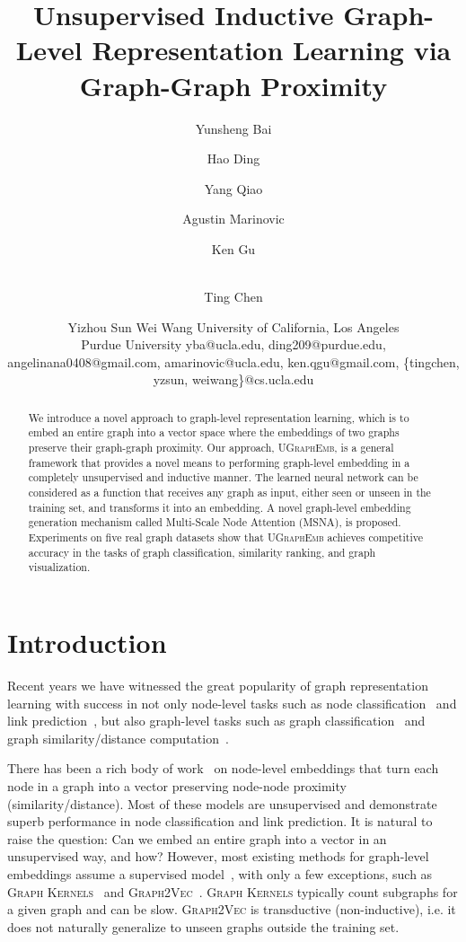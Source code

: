 \documentclass{article}
\title{Unsupervised Inductive Graph-Level Representation Learning via \\ Graph-Graph Proximity}
\author{
Yunsheng Bai
\and
Hao Ding\and
Yang Qiao\and
Agustin Marinovic\and
Ken Gu\and \\
Ting Chen\and
Yizhou Sun\And
Wei Wang
\affiliations
University of California, Los Angeles\\
Purdue University
\emails
yba@ucla.edu,
ding209@purdue.edu,
angelinana0408@gmail.com,
amarinovic@ucla.edu,
ken.qgu@gmail.com,
\{tingchen, yzsun, weiwang\}@cs.ucla.edu
}
\newcommand{\model}{\textsc{UGraphEmb}\xspace}
\newcommand{\gk}{\textsc{Graph Kernels}\xspace}
\newcommand{\gv}{\textsc{Graph2Vec}\xspace}
\begin{document}
\maketitle

\begin{abstract}

We introduce a novel approach to graph-level representation learning, which is to embed an entire graph into a vector space where the embeddings of two graphs preserve their graph-graph proximity. Our approach, \model, is a general framework that provides a novel means to performing graph-level embedding in a completely unsupervised and inductive manner. The learned neural network can be considered as a function that receives any graph as input, either seen or unseen in the training set, and transforms it into an embedding. A novel graph-level embedding generation mechanism called Multi-Scale Node Attention (MSNA), is proposed. Experiments on five real graph datasets show that \model achieves competitive accuracy in the tasks of graph classification, similarity ranking, and graph visualization.




\end{abstract}
 \section{Introduction}
\label{sec-intro}


Recent years we have witnessed the great popularity of graph representation learning with success in not only node-level tasks such as node classification~\cite{kipf2016semi} and link prediction~\cite{zhang2018link}, but also graph-level tasks such as graph classification~\cite{ying2018hierarchical} and graph similarity/distance computation~\cite{bai2018graph}. 


There has been a rich body of work~\cite{belkin2003laplacian,tang2015line,qiu2017network} 
on node-level embeddings that turn each node in a graph into a vector preserving node-node proximity (similarity/distance). Most of these models are unsupervised and demonstrate superb performance in node classification and link prediction. It is natural to raise the question: Can we embed an entire graph into a vector in an unsupervised way, and how?
However, most existing methods for graph-level embeddings assume a supervised model~\cite{ying2018hierarchical,zhang2018capsule}, with only a few exceptions, such as \gk~\cite{yanardag2015deep} and \gv~\cite{narayanan2017graph2vec}. \gk typically count subgraphs for a given graph and can be slow. \gv is transductive (non-inductive), i.e. it does not naturally generalize to unseen graphs outside the training set. 
\end{document}
